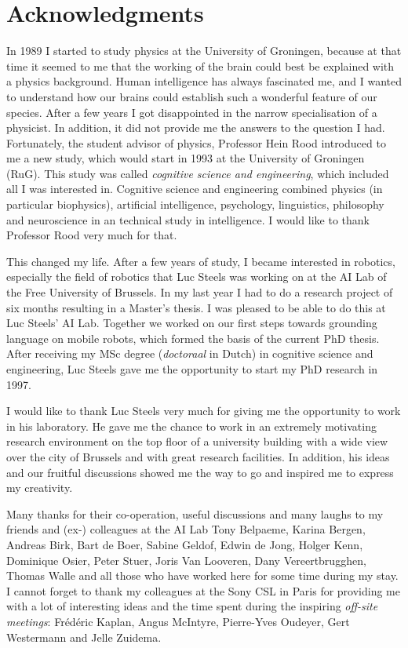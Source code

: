 \chapter*{Acknowledgments}

In 1989 I started to study physics at the University of Groningen, because at that time it seemed to me that the working of the brain could best be explained with a physics background. Human intelligence has always fascinated me, and I wanted to understand how our brains could establish such a wonderful feature of our species. After a few years I got disappointed in the narrow specialisation of a physicist. In addition, it did not provide me the answers to the question I had. Fortunately, the student advisor of physics, Professor Hein Rood introduced to me a new study, which would start in 1993 at the University of Groningen (RuG). This study was called {\em cognitive science and engineering}, which included all I was interested in. Cognitive science and engineering combined physics (in particular biophysics), artificial intelligence, psychology, linguistics, philosophy and neuroscience in an technical study in intelligence. I would like to thank Professor Rood very much for that.

This changed my life. After a few years of study, I became interested in robotics, especially the field of robotics that Luc Steels was working on at the AI Lab of the Free University of Brussels. In my last year I had to do a research project of six months resulting in a Master's thesis. I was pleased to be able to do this at Luc Steels' AI Lab. Together we worked on our first steps towards grounding language on mobile robots, which formed the basis of the current PhD thesis. After receiving my MSc degree ({\em doctoraal} in Dutch) in cognitive science and engineering, Luc Steels gave me the opportunity to start my PhD research in 1997.

I would like to thank Luc Steels very much for giving me the opportunity to work in his laboratory. He gave me the chance to work in an extremely motivating research environment on the top floor of a university building with a wide view over the city of Brussels and with great research facilities. In addition, his ideas and our fruitful discussions showed me the way to go and inspired me to express my creativity.

Many thanks for their co-operation, useful discussions and many laughs to my friends and (ex-) colleagues at the AI Lab Tony Belpaeme, Karina Bergen, Andreas Birk, Bart de Boer, Sabine Geldof, Edwin de Jong, Holger Kenn, Dominique Osier, Peter Stuer, Joris Van Looveren, Dany Vereertbrugghen, Thomas Walle and all those who have worked here for some time during my stay. I cannot forget to thank my colleagues at the Sony CSL in Paris for providing me with a lot of interesting ideas and the time spent during the inspiring {\em off-site meetings}: Fr\'ed\'eric Kaplan, Angus McIntyre, Pierre-Yves Oudeyer, Gert Westermann and Jelle Zuidema.

